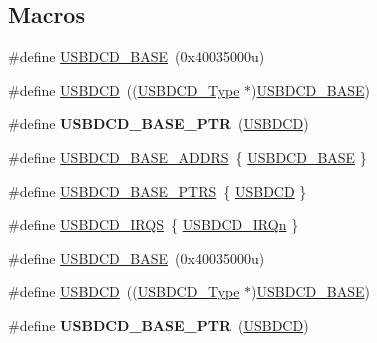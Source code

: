 \subsection*{Macros}
\begin{DoxyCompactItemize}
\item 
\#define \hyperlink{group__USBDCD__Peripheral__Access__Layer_ga56567d124166bfc332eefcbeb3c8bfb7}{U\+S\+B\+D\+C\+D\+\_\+\+B\+A\+SE}~(0x40035000u)
\item 
\#define \hyperlink{group__USBDCD__Peripheral__Access__Layer_gacd05c07582eca3f464f8c7436ed56ec1}{U\+S\+B\+D\+CD}~((\hyperlink{structUSBDCD__Type}{U\+S\+B\+D\+C\+D\+\_\+\+Type} $\ast$)\hyperlink{group__USBDCD__Peripheral__Access__Layer_ga56567d124166bfc332eefcbeb3c8bfb7}{U\+S\+B\+D\+C\+D\+\_\+\+B\+A\+SE})
\item 
\#define {\bfseries U\+S\+B\+D\+C\+D\+\_\+\+B\+A\+S\+E\+\_\+\+P\+TR}~(\hyperlink{group__USBDCD__Peripheral__Access__Layer_gacd05c07582eca3f464f8c7436ed56ec1}{U\+S\+B\+D\+CD})\hypertarget{group__USBDCD__Peripheral__Access__Layer_ga6289dc687e9b991508629237aeb61755}{}\label{group__USBDCD__Peripheral__Access__Layer_ga6289dc687e9b991508629237aeb61755}

\item 
\#define \hyperlink{group__USBDCD__Peripheral__Access__Layer_ga025e2ac90159213302b6b5801a3c8d22}{U\+S\+B\+D\+C\+D\+\_\+\+B\+A\+S\+E\+\_\+\+A\+D\+D\+RS}~\{ \hyperlink{group__USBDCD__Peripheral__Access__Layer_ga56567d124166bfc332eefcbeb3c8bfb7}{U\+S\+B\+D\+C\+D\+\_\+\+B\+A\+SE} \}
\item 
\#define \hyperlink{group__USBDCD__Peripheral__Access__Layer_ga343ff2427307e24846cef614df7cea8a}{U\+S\+B\+D\+C\+D\+\_\+\+B\+A\+S\+E\+\_\+\+P\+T\+RS}~\{ \hyperlink{group__USBDCD__Peripheral__Access__Layer_gacd05c07582eca3f464f8c7436ed56ec1}{U\+S\+B\+D\+CD} \}
\item 
\#define \hyperlink{group__USBDCD__Peripheral__Access__Layer_ga052db5d600e4b53eb3e2ea7ef8281b6e}{U\+S\+B\+D\+C\+D\+\_\+\+I\+R\+QS}~\{ \hyperlink{group__Interrupt__vector__numbers_gga666eb0caeb12ec0e281415592ae89083a92a4fa8925ba3e31f873313f577f18a7}{U\+S\+B\+D\+C\+D\+\_\+\+I\+R\+Qn} \}
\item 
\#define \hyperlink{group__USBDCD__Peripheral__Access__Layer_ga56567d124166bfc332eefcbeb3c8bfb7}{U\+S\+B\+D\+C\+D\+\_\+\+B\+A\+SE}~(0x40035000u)
\item 
\#define \hyperlink{group__USBDCD__Peripheral__Access__Layer_gacd05c07582eca3f464f8c7436ed56ec1}{U\+S\+B\+D\+CD}~((\hyperlink{structUSBDCD__Type}{U\+S\+B\+D\+C\+D\+\_\+\+Type} $\ast$)\hyperlink{group__USBDCD__Peripheral__Access__Layer_ga56567d124166bfc332eefcbeb3c8bfb7}{U\+S\+B\+D\+C\+D\+\_\+\+B\+A\+SE})
\item 
\#define {\bfseries U\+S\+B\+D\+C\+D\+\_\+\+B\+A\+S\+E\+\_\+\+P\+TR}~(\hyperlink{group__USBDCD__Peripheral__Access__Layer_gacd05c07582eca3f464f8c7436ed56ec1}{U\+S\+B\+D\+CD})\hypertarget{group__USBDCD__Peripheral__Access__Layer_ga6289dc687e9b991508629237aeb61755}{}\label{group__USBDCD__Peripheral__Access__Layer_ga6289dc687e9b991508629237aeb61755}


\end{DoxyCompactItemize}
